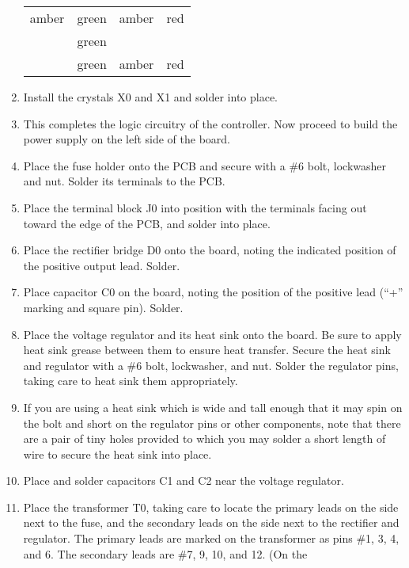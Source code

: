 \documentclass[12pt]{article}
\begin{document}
\begin{enumerate}
\begin{center}
	    \begin{tabular}{cccc}\\
		   amber & green & amber & red \\
		         & green \\
	             & green & amber & red 
		\end{tabular}
	   \end{center}
 \item Install the crystals X0 and X1 and solder
       into place.
 \item This completes the logic circuitry of the controller.  Now proceed to
       build the power supply on the left side of the board.
 \item Place the fuse holder onto the PCB and secure with a \#6 bolt,
       lockwasher and nut. Solder its terminals to the PCB.
 \item Place the terminal block J0 into position
       with the terminals facing out toward the edge 
       of the PCB, and solder into place.
 \item Place the rectifier bridge D0 onto the
       board, noting the indicated position of 
       the positive output lead.  Solder.
 \item Place capacitor C0 on the board, noting the
       position of the positive lead (``+'' marking
       and square pin).  Solder.
 \item Place the voltage regulator and its heat sink
       onto the board.  Be sure to apply heat sink grease between them to
	   ensure heat transfer.  
	   Secure the heat sink and regulator
	   with a \#6 bolt, lockwasher, and nut.  Solder the regulator pins, 
	   taking care to
	   heat sink them appropriately.
 \item If you are using a heat sink which is wide and tall enough that it
       may spin on the bolt and short on the regulator pins or other 
	   components, note that there are a pair of tiny holes provided to 
	   which you may
	   solder a short length of wire to secure the heat sink into place.
 \item Place and solder capacitors C1 and C2 near the voltage regulator.
 \item Place the transformer T0, taking care to 
       locate the primary leads on the side next
	   to the fuse, and the secondary leads on the
	   side next to the rectifier and regulator.
	   The primary leads are marked on the transformer as pins \#1, 3, 4,
	   and 6.  The secondary leads are \#7, 9, 10, and 12.  (On the

\end{enumerate}
\end{document}
